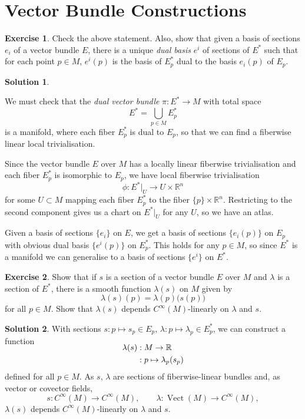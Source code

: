 \documentclass[11pt, a4paper]{report}
\theoremstyle{definition}
\newtheorem{exercise}{Exercise}[part]
\newtheorem{solution}{Solution}[part]
\newenvironment{ex}{\begin{exercise}}{\end{exercise}\pagebreak[1]}
\newenvironment{sol}{\begin{solution}}{\end{solution}\pagebreak[3]}
\DeclareMathOperator{\Vect}{Vect}
\begin{document}
\section{Vector Bundle Constructions}

\begin{ex}

Check the above statement.
Also, show that given a basis of sections $e_i$ of a vector bundle $E$, there is a unique \emph{dual basis} $e^i$ of sections of $E^*$ such that for each point $p \in M$, $e^i(p)$ is the basis of $E^*_p$ dual to the basis $e_i(p)$ of $E_p$.

\end{ex}

\begin{sol}\label{sol:dualvectorbundle}

We must check that the \emph{dual vector bundle} $\pi: E^* \to M$ with total space
\[
    E^* = \bigcup_{p \in M} E^*_p
\]
is a manifold, where each fiber $E^*_p$ is dual to $E_p$, so that we can find a fiberwise linear local trivialisation.

Since the vector bundle $E$ over $M$ has a locally linear fiberwise trivialisation and each fiber $E^*_p$ is isomorphic to $E_p$, we have local fiberwise trivialisation
\[
    \phi: E^*|_U \to U \times \mathbb{R}^n
\]
for some $U \subset M$ mapping each fiber $E^*_p$ to the fiber $\{p\} \times \mathbb{R}^n$. Restricting to the second component gives us a chart on $E^*|_U$ for any $U$, so we have an atlas.

Given a basis of sections $\{e_i\}$ on $E$, we get a basis of sections $\{e_i(p)\}$ on $E_p$ with obvious dual basis $\{e^i(p)\}$ on $E^*_p$.
This holds for any $p \in M$, so since $E^*$ is a manifold we can generalise to a basis of sections $\{e^i\}$ on $E^*$.

\end{sol}

\begin{ex}

Show that if $s$ is a section of a vector bundle $E$ over $M$ and $\lambda$ is a section of $E^*$, there is a smooth function $\lambda(s)$ on $M$ given by
\[
    \lambda(s)(p) = \lambda(p)\bigl(s(p)\bigr)
\]
for all $p \in M$. Show that $\lambda(s)$ depends $C^\infty(M)$-linearly on $\lambda$ and $s$.

\end{ex}

\begin{sol}

With sections $s: p \mapsto s_p \in E_p$, $\lambda: p \mapsto \lambda_p \in E^*_p$, we can construct a function
\begin{align*}
    \SwapAboveDisplaySkip
    \lambda(s) &: M \to \mathbb{R} \\
               &: p \mapsto \lambda_p (s_p)
\end{align*}
defined for all $p \in M$.
As $s$, $\lambda$ are sections of fiberwise-linear bundles and, as vector or covector fields,
\[
    s: C^\infty(M) \to C^\infty(M), \qquad \lambda: \Vect(M) \to C^\infty(M),
\]
$\lambda(s)$ depends $C^\infty(M)$-linearly on $\lambda$ and $s$.

\end{sol}
\end{document}
